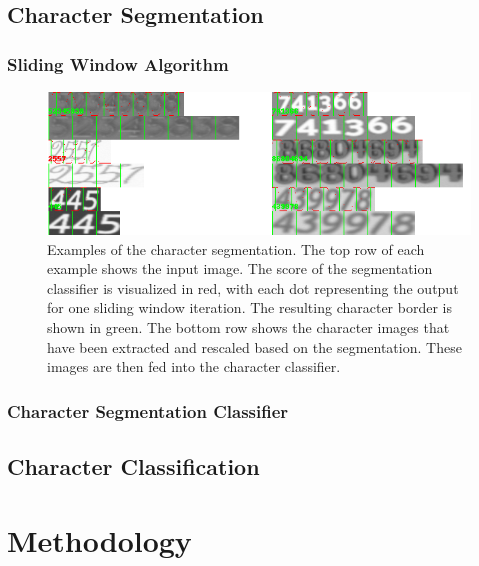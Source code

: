 \documentclass[11pt]{article}
\begin{document}
\subsection{Character Segmentation}
\subsubsection{Sliding Window Algorithm}
\begin{figure}[ht]
    \centering
    \includegraphics[width=1.1\linewidth]{fig/segmentation}
    \caption{
      Examples of the character segmentation. The top row of each example shows the input
      image. The score of the segmentation classifier is visualized in red, with each dot representing
      the output for one sliding window iteration. The resulting character border is shown in green.
      The bottom row shows the character images that have been extracted and rescaled based on the
      segmentation. These images are then fed into the character classifier. }
    \label{fig:segmentation}
\end{figure}
\subsubsection{Character Segmentation Classifier}


\subsection{Character Classification}

\section{Methodology}
\end{document}
